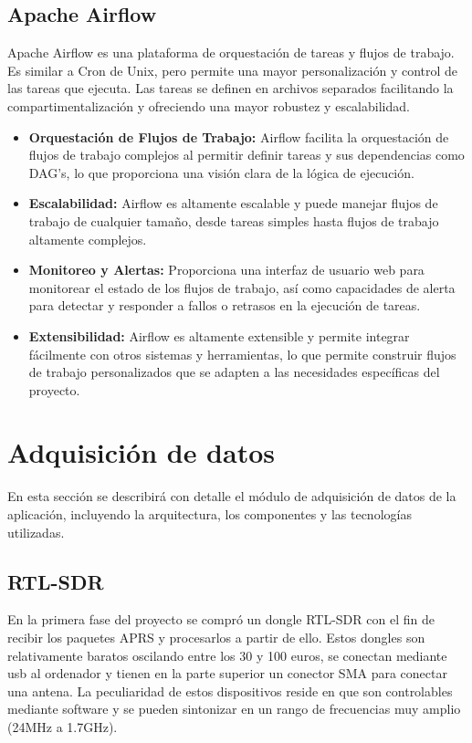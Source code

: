 \subsection{Apache Airflow}
Apache Airflow es una plataforma de orquestación de tareas y flujos de trabajo. Es similar a Cron de Unix, pero permite una mayor personalización y control de las tareas que ejecuta. Las tareas se definen en archivos separados facilitando la compartimentalización y ofreciendo una mayor robustez y escalabilidad.
\begin{itemize}
	\item \textbf{Orquestación de Flujos de Trabajo:} Airflow facilita la orquestación de flujos de trabajo complejos al permitir definir tareas y sus dependencias como DAG's, lo que proporciona una visión clara de la lógica de ejecución.
	\item \textbf{Escalabilidad:} Airflow es altamente escalable y puede manejar flujos de trabajo de cualquier tamaño, desde tareas simples hasta flujos de trabajo altamente complejos.
	\item \textbf{Monitoreo y Alertas:} Proporciona una interfaz de usuario web para monitorear el estado de los flujos de trabajo, así como capacidades de alerta para detectar y responder a fallos o retrasos en la ejecución de tareas.
	\item \textbf{Extensibilidad:} Airflow es altamente extensible y permite integrar fácilmente con otros sistemas y herramientas, lo que permite construir flujos de trabajo personalizados que se adapten a las necesidades específicas del proyecto.
\end{itemize}

\section{Adquisición de datos}
En esta sección se describirá con detalle el módulo de adquisición de datos de la aplicación, incluyendo la arquitectura, los componentes y las tecnologías utilizadas.
\subsection{RTL-SDR}
En la primera fase del proyecto se compró un dongle RTL-SDR con el fin de recibir los paquetes APRS y procesarlos a partir de ello. Estos dongles son relativamente baratos oscilando entre los 30 y 100 euros, se conectan mediante usb al ordenador y tienen en la parte superior un conector SMA para conectar una antena. La peculiaridad de estos dispositivos reside en que son controlables mediante software y se pueden sintonizar en un rango de frecuencias muy amplio (24MHz a 1.7GHz).

